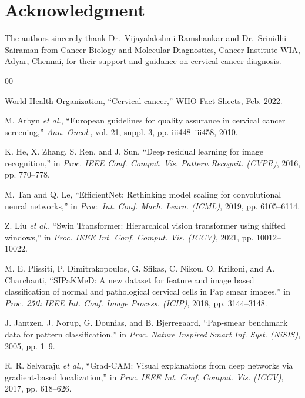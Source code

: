 \documentclass[conference]{IEEEtran}
\begin{document}
\section*{Acknowledgment}
The authors sincerely thank Dr.~Vijayalakshmi Ramshankar and Dr.~Srinidhi Sairaman from Cancer Biology and Molecular Diagnostics, Cancer Institute WIA, Adyar, Chennai, for their support and guidance on cervical cancer diagnosis.

\begin{thebibliography}{00}

World Health Organization, ``Cervical cancer,'' WHO Fact Sheets, Feb. 2022.

M. Arbyn \textit{et al.}, ``European guidelines for quality assurance in cervical cancer screening,'' \textit{Ann. Oncol.}, vol. 21, suppl. 3, pp. iii448--iii458, 2010.

K. He, X. Zhang, S. Ren, and J. Sun, ``Deep residual learning for image recognition,'' in \textit{Proc. IEEE Conf. Comput. Vis. Pattern Recognit. (CVPR)}, 2016, pp. 770--778.

M. Tan and Q. Le, ``EfficientNet: Rethinking model scaling for convolutional neural networks,'' in \textit{Proc. Int. Conf. Mach. Learn. (ICML)}, 2019, pp. 6105--6114.

Z. Liu \textit{et al.}, ``Swin Transformer: Hierarchical vision transformer using shifted windows,'' in \textit{Proc. IEEE Int. Conf. Comput. Vis. (ICCV)}, 2021, pp. 10012--10022.

M. E. Plissiti, P. Dimitrakopoulos, G. Sfikas, C. Nikou, O. Krikoni, and A. Charchanti, ``SIPaKMeD: A new dataset for feature and image based classification of normal and pathological cervical cells in Pap smear images,'' in \textit{Proc. 25th IEEE Int. Conf. Image Process. (ICIP)}, 2018, pp. 3144--3148.

J. Jantzen, J. Norup, G. Dounias, and B. Bjerregaard, ``Pap-smear benchmark data for pattern classification,'' in \textit{Proc. Nature Inspired Smart Inf. Syst. (NiSIS)}, 2005, pp. 1--9.

R. R. Selvaraju \textit{et al.}, ``Grad-CAM: Visual explanations from deep networks via gradient-based localization,'' in \textit{Proc. IEEE Int. Conf. Comput. Vis. (ICCV)}, 2017, pp. 618--626.


\end{thebibliography}
\end{document}
